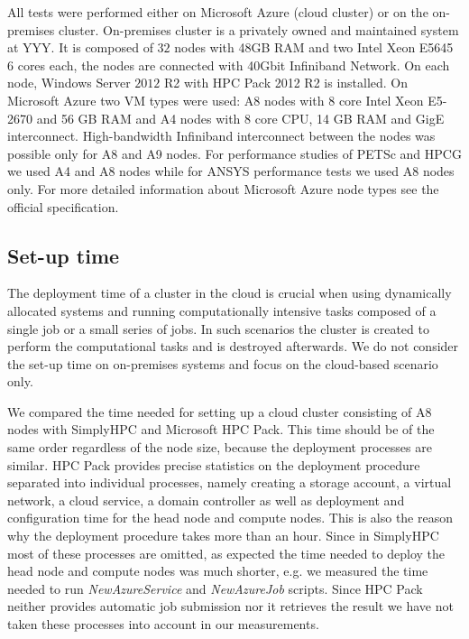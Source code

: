 \documentclass[a4paper,twoside]{article}
\begin{document}
All tests were performed either on Microsoft Azure (cloud cluster) or on the on-premises cluster. 
On-premises cluster is a privately owned and maintained system at 
YYY. It is composed of $32$ nodes with 48GB RAM and two Intel Xeon E5645 6 cores each, the nodes are connected with 40Gbit Infiniband Network. On each node, Windows Server $2012$ R2 with HPC Pack 2012 R2 is installed.
On Microsoft Azure two VM types were used: A8 nodes with 8 core Intel Xeon E5-2670 and 56 GB RAM and A4 nodes with 8 core CPU, 14 GB RAM and GigE interconnect. High-bandwidth Infiniband interconnect between the nodes was possible only for A8 and A9 nodes. For performance studies of PETSc and HPCG we used A4 and A8 nodes while for ANSYS performance tests we used A8 nodes only. For more detailed information about Microsoft Azure node types see the official specification.

\subsection{Set-up time}
The deployment time of a cluster in the cloud is crucial when using dynamically allocated systems and running computationally intensive tasks composed of a single job or a small series of jobs. In such scenarios the cluster is created to perform the computational tasks and is destroyed afterwards. We do not consider the set-up time on on-premises systems and focus on the cloud-based scenario only. 

We compared the time needed for setting up a cloud cluster consisting of A8 nodes with SimplyHPC and Microsoft HPC Pack. This time should be of the same order regardless of the node size, because the deployment processes are similar. HPC Pack provides precise statistics on the deployment procedure separated into individual processes, namely creating a storage account, a virtual network, a cloud service, a domain controller as well as deployment and configuration time for the head node and compute nodes. This is also the reason why the deployment procedure takes more than an hour. Since in SimplyHPC most of these processes are omitted, as expected the time needed to deploy the head node and compute nodes was much shorter, e.g. we measured the time needed to run \textit{NewAzureService} and \textit{NewAzureJob} scripts. Since HPC Pack neither provides automatic job submission nor it retrieves the result we have not taken these processes into account in our measurements. 
\end{document}
